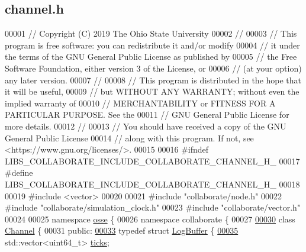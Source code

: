 \hypertarget{channel_8h_source}{}\subsection{channel.\+h}
\label{channel_8h_source}

\begin{DoxyCode}
00001 \textcolor{comment}{// Copyright (C) 2019 The Ohio State University}
00002 \textcolor{comment}{//}
00003 \textcolor{comment}{// This program is free software: you can redistribute it and/or modify}
00004 \textcolor{comment}{// it under the terms of the GNU General Public License as published by}
00005 \textcolor{comment}{// the Free Software Foundation, either version 3 of the License, or}
00006 \textcolor{comment}{// (at your option) any later version.}
00007 \textcolor{comment}{//}
00008 \textcolor{comment}{// This program is distributed in the hope that it will be useful,}
00009 \textcolor{comment}{// but WITHOUT ANY WARRANTY; without even the implied warranty of}
00010 \textcolor{comment}{// MERCHANTABILITY or FITNESS FOR A PARTICULAR PURPOSE.  See the}
00011 \textcolor{comment}{// GNU General Public License for more details.}
00012 \textcolor{comment}{//}
00013 \textcolor{comment}{// You should have received a copy of the GNU General Public License}
00014 \textcolor{comment}{// along with this program.  If not, see <https://www.gnu.org/licenses/>.}
00015 
00016 \textcolor{preprocessor}{#ifndef LIBS\_COLLABORATE\_INCLUDE\_COLLABORATE\_CHANNEL\_H\_}
00017 \textcolor{preprocessor}{#define LIBS\_COLLABORATE\_INCLUDE\_COLLABORATE\_CHANNEL\_H\_}
00018 
00019 \textcolor{preprocessor}{#include <vector>}
00020 
00021 \textcolor{preprocessor}{#include "collaborate/node.h"}
00022 \textcolor{preprocessor}{#include "collaborate/simulation\_clock.h"}
00023 \textcolor{preprocessor}{#include "collaborate/vector.h"}
00024 
00025 \textcolor{keyword}{namespace }\hyperlink{namespaceosse}{osse} \{
00026 \textcolor{keyword}{namespace }collaborate \{
00027 
\hyperlink{classosse_1_1collaborate_1_1_channel}{00030} \textcolor{keyword}{class }\hyperlink{classosse_1_1collaborate_1_1_channel}{Channel} \{
00031  \textcolor{keyword}{public}:
\hyperlink{structosse_1_1collaborate_1_1_channel_1_1_log_buffer}{00033}   \textcolor{keyword}{typedef} \textcolor{keyword}{struct }\hyperlink{structosse_1_1collaborate_1_1_channel_1_1_log_buffer}{LogBuffer} \{
\hyperlink{structosse_1_1collaborate_1_1_channel_1_1_log_buffer_a2afbd3902c0b14c4e7d92e6aaca9ddbe}{00035}     std::vector<uint64\_t> \hyperlink{structosse_1_1collaborate_1_1_channel_1_1_log_buffer_a2afbd3902c0b14c4e7d92e6aaca9ddbe}{ticks};

\end{DoxyCode}
